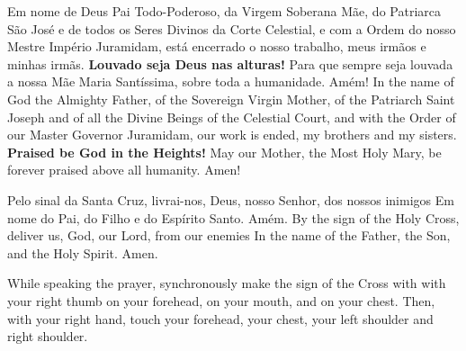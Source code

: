 {\begin{songs}{}
      \beginverse
        Em nome de Deus Pai Todo-Poderoso, da Virgem
        Soberana Mãe, do Patriarca São José e de todos
        os Seres Divinos da Corte Celestial, e com
        a Ordem do nosso Mestre Império Juramidam,
        está encerrado o nosso trabalho, meus irmãos
        e minhas irmãs.
        \textbf{Louvado seja Deus nas alturas!}
        \parspace
        Para que sempre seja louvada a nossa Mãe Maria
        Santíssima, sobre toda a humanidade. Amém!
      \endverse
      \beginverse
        In the name of God the Almighty Father, of the Sovereign
        Virgin Mother, of the Patriarch Saint Joseph and of all
        the Divine Beings of the Celestial Court, and with
        the Order of our Master Governor Juramidam,
        our work is ended, my brothers and my sisters.
        \textbf{Praised be God in the Heights!}
        \parspace
        May our Mother, the Most Holy Mary, be forever
        praised above all humanity. Amen!
      \endverse
    \endsong


      \beginverse
        Pelo sinal da Santa Cruz,
        livrai-nos, Deus, nosso Senhor,
        dos nossos inimigos
        \parspace
        Em nome do Pai,
        do Filho e
        do Espírito Santo.
        \parspace
        Amém.
      \endverse
      \beginverse
        By the sign of the Holy Cross,
        deliver us, God, our Lord,
        from our enemies
        \parspace
        In the name of the Father,
        the Son, and
        the Holy Spirit.
        \parspace
        Amen.
      \endverse
      \begin{note}
        While speaking the prayer, synchronously make
        the sign of the Cross with with your right thumb
        on your forehead,
        on your mouth, and
        on your chest.
        \parspace
        Then, with your right hand, touch
        your forehead,
        your chest,
        your left shoulder and right shoulder.
      \end{note}
    \endsong

  \end{songs}

}
